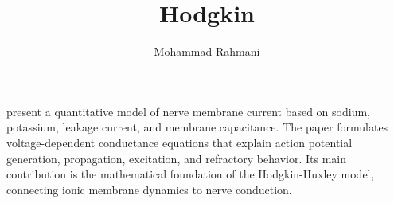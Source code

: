 \documentclass[a4paper]{article}
\title{Hodgkin}
\date{}
\author{Mohammad Rahmani}
\begin{document}
    \maketitle
    \cite{hodgkin-1952-a-quantitative-description-of-membrane-current-and-its-application-to-conduction-and-excitation-in-nerve} present a quantitative model of nerve membrane current based on sodium, potassium, leakage current, and membrane capacitance.
    The paper formulates voltage-dependent conductance equations that explain action potential generation, propagation, excitation, and refractory behavior.
    Its main contribution is the mathematical foundation of the Hodgkin-Huxley model, connecting ionic membrane dynamics to nerve conduction.
    
    
\end{document}
